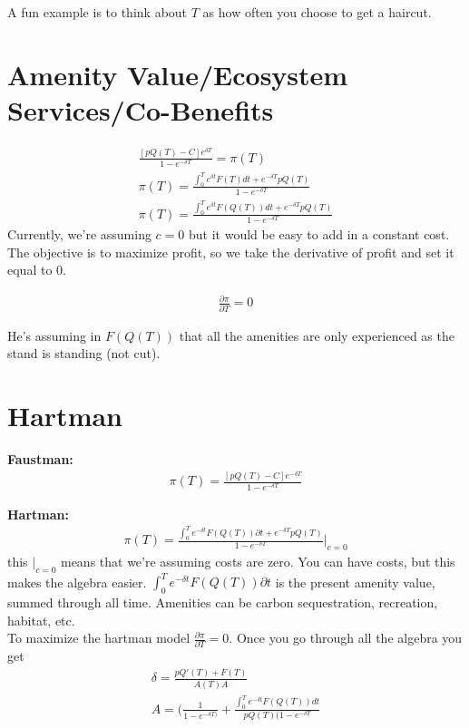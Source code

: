 \documentclass[12pt]{article}
\begin{document}
A fun example is to think about $T$ as how often you choose to get a haircut. 

\section{Amenity Value/Ecosystem Services/Co-Benefits}
\begin{align}
    \frac{[pQ(T) - C]e^{\delta T}}{1 - e^{-\delta T}} = \pi(T)\\
    \pi(T) = \frac{\int_0^T e^{\delta t}F(T) dt + e^{-\delta T} p Q(T)}{1 - e^{-\delta T}}\\
    \pi(T) = \frac{\int_0^T e^{\delta t}F(Q(T)) dt + e^{-\delta T} p Q(T)}{1 - e^{-\delta T}}
\end{align}
Currently, we're assuming $c = 0$ but it would be easy to add in a constant cost. The objective is to maximize profit, so we take the derivative of profit and set it equal to 0. 

\begin{align}
    \frac{\partial \pi}{\partial T} = 0
\end{align}

He's assuming in $F(Q(T))$ that all the amenities are only experienced as the stand is standing (not cut). 

\section{Hartman}

\textbf{Faustman:}
\begin{align}
    \pi(T) = \frac{[pQ(T) - C]e^{-\delta T}}{1 - e^{-\delta T}} 
\end{align}

\textbf{Hartman:}
\begin{align}
    \pi(T) = \frac{\int_0^T e^{-\delta t} F(Q(T)) \partial t + e^{-\delta T} p Q(T) }{1 - e^{-\delta T}}|_{c = 0}
\end{align}
this $|_{c=0}$ means that we're assuming costs are zero. You can have costs, but this makes the algebra easier. $\int_0^T e^{-\delta t} F(Q(T)) \partial t$ is the present amenity value, summed through all time. Amenities can be carbon sequestration, recreation, habitat, etc. \\

To maximize the hartman model $\frac{\partial \pi}{\partial T} = 0$. Once  you go through all the algebra you get 
\begin{align}
    \delta = \frac{pQ'(T) + F(T)}{A(T)A} \label{hart_solution}\\
    A = (\frac{1}{1 - e^{-\delta T)}} + \frac{\int_0^T e^{-\delta t} F(Q(T)) dt}{pQ(T)(1 - e^{-\delta T}}
\end{align}
\end{document}
